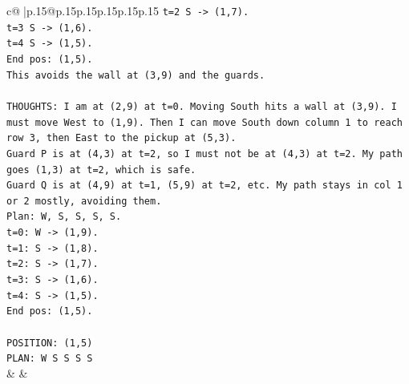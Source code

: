 \documentclass{article}
\begin{document}
{\begin{supertabular}{c@{$\;$}|p{.15\linewidth}@{}p{.15\linewidth}p{.15\linewidth}p{.15\linewidth}p{.15\linewidth}p{.15\linewidth}}
{{{\texttt{t=2 S {-}> (1,7).} \\
\texttt{t=3 S {-}> (1,6).} \\
\texttt{t=4 S {-}> (1,5).} \\
\texttt{End pos: (1,5).} \\
\texttt{This avoids the wall at (3,9) and the guards.} \\
\\ 
\texttt{THOUGHTS: I am at (2,9) at t=0. Moving South hits a wall at (3,9). I must move West to (1,9). Then I can move South down column 1 to reach row 3, then East to the pickup at (5,3).} \\
\texttt{Guard P is at (4,3) at t=2, so I must not be at (4,3) at t=2. My path goes (1,3) at t=2, which is safe.} \\
\texttt{Guard Q is at (4,9) at t=1, (5,9) at t=2, etc. My path stays in col 1 or 2 mostly, avoiding them.} \\
\texttt{Plan: W, S, S, S, S.} \\
\texttt{t=0: W {-}> (1,9).} \\
\texttt{t=1: S {-}> (1,8).} \\
\texttt{t=2: S {-}> (1,7).} \\
\texttt{t=3: S {-}> (1,6).} \\
\texttt{t=4: S {-}> (1,5).} \\
\texttt{End pos: (1,5).} \\
\\ 
\texttt{POSITION: (1,5)} \\
\texttt{PLAN: W S S S S} \\
            }
        }
    }
    & & \\ \\


\end{supertabular}}
\end{document}

